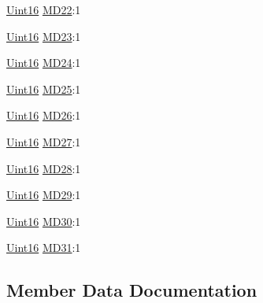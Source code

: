 \begin{DoxyCompactItemize}
\item 
\hyperlink{_d_s_p2833x___device_8h_a59a9f6be4562c327cbfb4f7e8e18f08b}{Uint16} \hyperlink{struct_c_a_n_m_d___b_i_t_s_a664881b4b0d92d66ad705d011c6ae655}{M\+D22}\+:1
\item 
\hyperlink{_d_s_p2833x___device_8h_a59a9f6be4562c327cbfb4f7e8e18f08b}{Uint16} \hyperlink{struct_c_a_n_m_d___b_i_t_s_a2e0ddcc5e1e0fd3cc4dc90990c637430}{M\+D23}\+:1
\item 
\hyperlink{_d_s_p2833x___device_8h_a59a9f6be4562c327cbfb4f7e8e18f08b}{Uint16} \hyperlink{struct_c_a_n_m_d___b_i_t_s_a3b6725a7c2c445384b3471f5834bc59f}{M\+D24}\+:1
\item 
\hyperlink{_d_s_p2833x___device_8h_a59a9f6be4562c327cbfb4f7e8e18f08b}{Uint16} \hyperlink{struct_c_a_n_m_d___b_i_t_s_ab943d2cebeaefaacc89abf7406a39cf8}{M\+D25}\+:1
\item 
\hyperlink{_d_s_p2833x___device_8h_a59a9f6be4562c327cbfb4f7e8e18f08b}{Uint16} \hyperlink{struct_c_a_n_m_d___b_i_t_s_a5991de14237982c5f349a77d0a3f74c8}{M\+D26}\+:1
\item 
\hyperlink{_d_s_p2833x___device_8h_a59a9f6be4562c327cbfb4f7e8e18f08b}{Uint16} \hyperlink{struct_c_a_n_m_d___b_i_t_s_aa03cdde0aa28e763675800b8f7065be8}{M\+D27}\+:1
\item 
\hyperlink{_d_s_p2833x___device_8h_a59a9f6be4562c327cbfb4f7e8e18f08b}{Uint16} \hyperlink{struct_c_a_n_m_d___b_i_t_s_aaa0d3844348aadffb7bc466c99487433}{M\+D28}\+:1
\item 
\hyperlink{_d_s_p2833x___device_8h_a59a9f6be4562c327cbfb4f7e8e18f08b}{Uint16} \hyperlink{struct_c_a_n_m_d___b_i_t_s_a7c19d9647397247df33d39cf9deb1262}{M\+D29}\+:1
\item 
\hyperlink{_d_s_p2833x___device_8h_a59a9f6be4562c327cbfb4f7e8e18f08b}{Uint16} \hyperlink{struct_c_a_n_m_d___b_i_t_s_af794b2df86f556571c451c47ca32d8e6}{M\+D30}\+:1
\item 
\hyperlink{_d_s_p2833x___device_8h_a59a9f6be4562c327cbfb4f7e8e18f08b}{Uint16} \hyperlink{struct_c_a_n_m_d___b_i_t_s_a6b00045b814b4423bc4b2d235b0add5b}{M\+D31}\+:1
\end{DoxyCompactItemize}


\subsection{Member Data Documentation}
\hypertarget{struct_c_a_n_m_d___b_i_t_s_a5580b0758bb04714c6d9c9fe6eb2c764}{}
